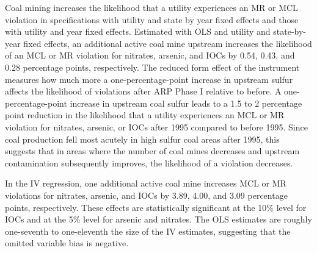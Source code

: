 \documentclass[12pt]{article}
\begin{document}

Coal mining increases the likelihood that a utility experiences an MR or MCL violation in specifications with utility and state by year fixed effects and those with utility and year fixed effects. Estimated with OLS and utility and state-by-year fixed effects, an additional active coal mine upstream increases the likelihood of an MCL or MR violation for nitrates, arsenic, and IOCs by 0.54, 0.43, and 0.28 percentage points, respectively. The reduced form effect of the instrument measures how much more a one-percentage-point increase in upstream sulfur affects the likelihood of violations after ARP Phase I relative to before. A one-percentage-point increase in upstream coal sulfur leads to a 1.5 to 2 percentage point reduction in the likelihood that a utility experiences an MCL or MR violation for nitrates, arsenic, or IOCs after 1995 compared to before 1995. Since coal production fell most acutely in high sulfur coal areas after 1995, this suggests that in areas where the number of coal mines decreases and upstream contamination subsequently improves, the likelihood of a violation decreases.

In the IV regression, one additional active coal mine increases MCL or MR violations for nitrates, arsenic, and IOCs by 3.89, 4.00, and 3.09 percentage points, respectively. These effects are statistically significant at the 10\% level for IOCs and at the 5\% level for arsenic and nitrates. The OLS estimates are roughly one-seventh to one-eleventh the size of the IV estimates, suggesting that the omitted variable bias is negative.
\end{document}
